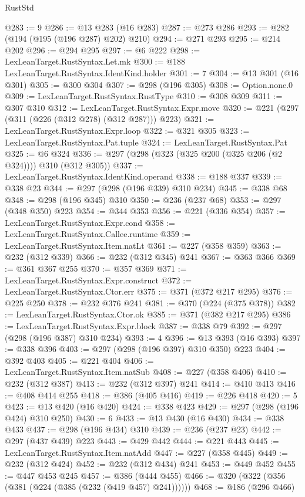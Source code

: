 \begin{lexlean}{RustStd}
\begin{coremodule}
@283 := 9
@286 := @13 @283 (@16 @283)
@287 := @273 @286
@293 := @282 (@194 (@195 (@196 @287) @202) @210)
@294 := @271 @293
@295 := @214 @202
@296 := @294 @295
@297 := @6 @222
@298 := LexLeanTarget.RustSyntax.Let.mk
@300 := @188 LexLeanTarget.RustSyntax.IdentKind.holder
@301 := 7
@304 := @13 @301 (@16 @301)
@305 := @300 @304
@307 := @298 (@196 @305)
@308 := Option.none.{0}
@309 := LexLeanTarget.RustSyntax.RustType
@310 := @308 @309
@311 := @307 @310
@312 := LexLeanTarget.RustSyntax.Expr.move
@320 := @221 (@297 (@311 (@226 (@312 @278) (@312 @287))) @223)
@321 := LexLeanTarget.RustSyntax.Expr.loop
@322 := @321 @305
@323 := LexLeanTarget.RustSyntax.Pat.tuple
@324 := LexLeanTarget.RustSyntax.Pat
@325 := @6 @324
@336 := @297 (@298 (@323 (@325 @200 (@325 @206 (@2 @324)))) @310 (@312 @305))
@337 := LexLeanTarget.RustSyntax.IdentKind.operand
@338 := @188 @337
@339 := @338 @23
@344 := @297 (@298 (@196 @339) @310 @234)
@345 := @338 @68
@348 := @298 (@196 @345) @310
@350 := @236 (@237 @68)
@353 := @297 (@348 @350) @223
@354 := @344 @353
@356 := @221 (@336 @354)
@357 := LexLeanTarget.RustSyntax.Expr.cond
@358 := LexLeanTarget.RustSyntax.Callee.runtime
@359 := LexLeanTarget.RustSyntax.Item.natLt
@361 := @227 (@358 @359)
@363 := @232 (@312 @339)
@366 := @232 (@312 @345) @241
@367 := @363 @366
@369 := @361 @367 @255
@370 := @357 @369
@371 := LexLeanTarget.RustSyntax.Expr.construct
@372 := LexLeanTarget.RustSyntax.Ctor.err
@375 := @371 (@372 @217 @295)
@376 := @225 @250
@378 := @232 @376 @241
@381 := @370 (@224 (@375 @378))
@382 := LexLeanTarget.RustSyntax.Ctor.ok
@385 := @371 (@382 @217 @295)
@386 := LexLeanTarget.RustSyntax.Expr.block
@387 := @338 @79
@392 := @297 (@298 (@196 @387) @310 @234)
@393 := 4
@396 := @13 @393 (@16 @393)
@397 := @338 @396
@403 := @297 (@298 (@196 @397) @310 @350) @223
@404 := @392 @403
@405 := @221 @404
@406 := LexLeanTarget.RustSyntax.Item.natSub
@408 := @227 (@358 @406)
@410 := @232 (@312 @387)
@413 := @232 (@312 @397) @241
@414 := @410 @413
@416 := @408 @414 @255
@418 := @386 (@405 @416)
@419 := @226 @418
@420 := 5
@423 := @13 @420 (@16 @420)
@424 := @338 @423
@429 := @297 (@298 (@196 @424) @310 @250)
@430 := 6
@433 := @13 @430 (@16 @430)
@434 := @338 @433
@437 := @298 (@196 @434) @310
@439 := @236 (@237 @23)
@442 := @297 (@437 @439) @223
@443 := @429 @442
@444 := @221 @443
@445 := LexLeanTarget.RustSyntax.Item.natAdd
@447 := @227 (@358 @445)
@449 := @232 (@312 @424)
@452 := @232 (@312 @434) @241
@453 := @449 @452
@455 := @447 @453 @245
@457 := @386 (@444 @455)
@466 := @320 (@322 (@356 (@381 (@224 (@385 (@232 (@419 @457) @241))))))
@468 := @186 (@296 @466)

\end{coremodule}
\end{lexlean}
